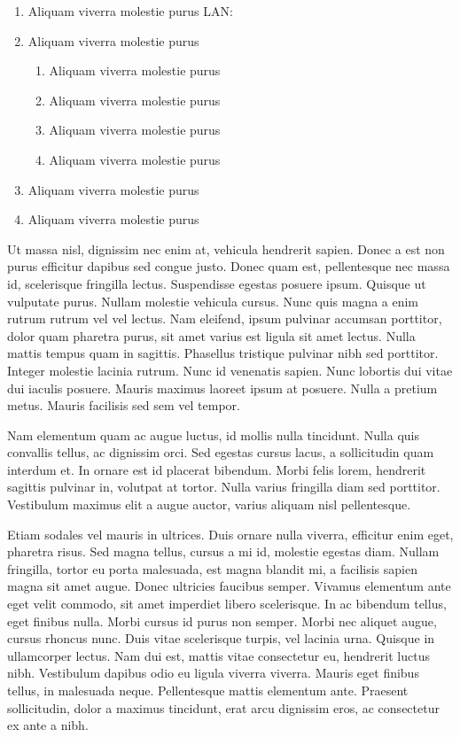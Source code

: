 \documentclass{report}
\begin{document}
	\begin{enumerate}[label=Proposition \arabic* , leftmargin=*]
\item Aliquam viverra molestie purus \gls{LAN}:
\item Aliquam viverra molestie purus
    \begin{enumerate}[label=\roman*]
    \item Aliquam viverra molestie purus
    \item Aliquam viverra molestie purus
    \item Aliquam viverra molestie purus
    \item Aliquam viverra molestie purus
    \end{enumerate}
\item Aliquam viverra molestie purus
\item Aliquam viverra molestie purus
\end{enumerate}


Ut massa nisl, dignissim nec enim at, vehicula hendrerit sapien. Donec a est non purus efficitur dapibus sed congue justo. Donec quam est, pellentesque nec massa id, scelerisque fringilla lectus. Suspendisse egestas posuere ipsum. Quisque ut vulputate purus. Nullam molestie vehicula cursus. Nunc quis magna a enim rutrum rutrum vel vel lectus. Nam eleifend, ipsum pulvinar accumsan porttitor, dolor quam pharetra purus, sit amet varius est ligula sit amet lectus. Nulla mattis tempus quam in sagittis. Phasellus tristique pulvinar nibh sed porttitor. Integer molestie lacinia rutrum. Nunc id venenatis sapien. Nunc lobortis dui vitae dui iaculis posuere. Mauris maximus laoreet ipsum at posuere. Nulla a pretium metus. Mauris facilisis sed sem vel tempor.

Nam elementum quam ac augue luctus, id mollis nulla tincidunt. Nulla quis convallis tellus, ac dignissim orci. Sed egestas cursus lacus, a sollicitudin quam interdum et. In ornare est id placerat bibendum. Morbi felis lorem, hendrerit sagittis pulvinar in, volutpat at tortor. Nulla varius fringilla diam sed porttitor. Vestibulum maximus elit a augue auctor, varius aliquam nisl pellentesque.

Etiam sodales vel mauris in ultrices. Duis ornare nulla viverra, efficitur enim eget, pharetra risus. Sed magna tellus, cursus a mi id, molestie egestas diam. Nullam fringilla, tortor eu porta malesuada, est magna blandit mi, a facilisis sapien magna sit amet augue. Donec ultricies faucibus semper. Vivamus elementum ante eget velit commodo, sit amet imperdiet libero scelerisque. In ac bibendum tellus, eget finibus nulla. Morbi cursus id purus non semper. Morbi nec aliquet augue, cursus rhoncus nunc. Duis vitae scelerisque turpis, vel lacinia urna. Quisque in ullamcorper lectus. Nam dui est, mattis vitae consectetur eu, hendrerit luctus nibh. Vestibulum dapibus odio eu ligula viverra viverra. Mauris eget finibus tellus, in malesuada neque. Pellentesque mattis elementum ante. Praesent sollicitudin, dolor a maximus tincidunt, erat arcu dignissim eros, ac consectetur ex ante a nibh.
\end{document}
